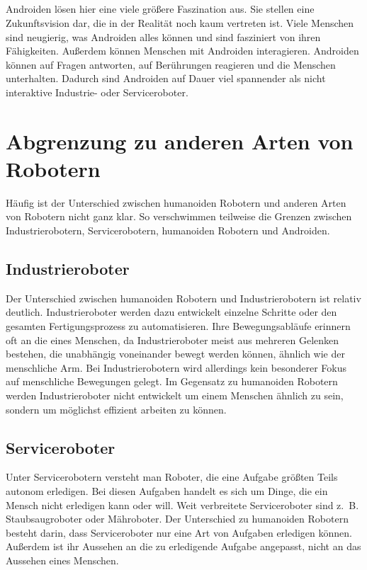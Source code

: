 \subparagraph{}
Androiden lösen hier eine viele größere Faszination aus. Sie
stellen eine Zukunftsvision dar, die in der Realität noch kaum vertreten ist.
Viele Menschen sind neugierig, was Androiden alles können und sind fasziniert
von ihren Fähigkeiten. Außerdem können Menschen mit Androiden interagieren.
Androiden können auf Fragen antworten, auf Berührungen reagieren und die
Menschen unterhalten. Dadurch sind Androiden auf Dauer viel spannender als nicht
interaktive Industrie- oder Serviceroboter. \cite{Dautenhahn2011}

\section{Abgrenzung zu anderen Arten von Robotern}\label{sec:abgrenzung}
Häufig ist der Unterschied zwischen humanoiden Robotern und anderen Arten von
Robotern nicht ganz klar. So verschwimmen teilweise die Grenzen zwischen
Industrierobotern, Servicerobotern, humanoiden Robotern und Androiden.

\subsection{Industrieroboter}\label{sec:industrieroboter}
Der Unterschied zwischen humanoiden Robotern und Industrierobotern ist relativ
deutlich. Industrieroboter werden dazu entwickelt einzelne Schritte oder den
gesamten Fertigungsprozess zu automatisieren. Ihre Bewegungsabläufe erinnern oft
an die eines Menschen, da Industrieroboter meist aus mehreren Gelenken bestehen,
die unabhängig voneinander bewegt werden können, ähnlich wie der menschliche
Arm. \cite{Weber2017} Bei Industrierobotern wird allerdings kein besonderer
Fokus auf menschliche Bewegungen gelegt. Im Gegensatz zu humanoiden Robotern
werden Industrieroboter nicht entwickelt um einem Menschen ähnlich zu sein,
sondern um möglichst effizient arbeiten zu können.

\subsection{Serviceroboter}\label{sec:serviceroboter}
Unter Servicerobotern versteht man Roboter, die eine Aufgabe größten Teils
autonom erledigen. Bei diesen Aufgaben handelt es sich um Dinge, die ein Mensch
nicht erledigen kann oder will. Weit verbreitete Serviceroboter sind z.~B.
Staubsaugroboter oder Mähroboter. Der Unterschied zu humanoiden Robotern besteht
darin, dass Serviceroboter nur eine Art von Aufgaben erledigen können.
Außerdem ist ihr Aussehen an die zu erledigende Aufgabe angepasst, nicht an das
Aussehen eines Menschen.

